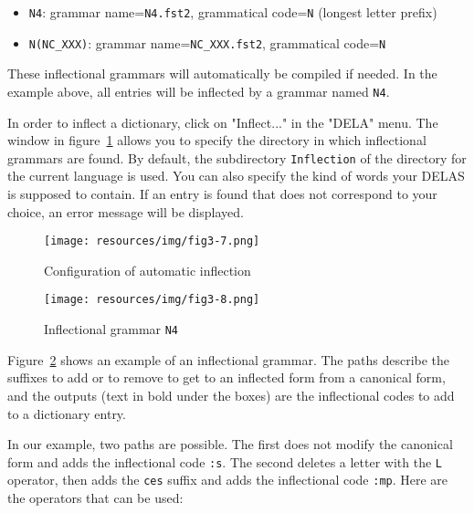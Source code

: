 \begin{itemize}
  \item \verb+N4+: grammar name=\verb+N4.fst2+, grammatical code=\verb+N+
  (longest letter prefix)
  \item \verb+N(NC_XXX)+: grammar name=\verb+NC_XXX.fst2+, grammatical code=\verb+N+
\end{itemize}

\bigskip
\noindent These inflectional grammars 
will automatically be
compiled if needed. In the example above, all entries will be inflected by a grammar named \verb+N4+.

\bigskip
\noindent In order to  inflect a dictionary, click on "Inflect..." in the "DELA" menu. The
window in figure~\ref{fig-inflection-configuration} allows you to specify the
directory in which inflectional grammars are found. By default, the subdirectory
\verb+Inflection+ of the directory for the current language is used. You can
also specify the kind of words your DELAS is supposed to contain. If an entry is
found that does not correspond to your choice, an error message will be
displayed.

\bigskip
\begin{figure}[!ht]
\begin{center}
\texttt{[image: resources/img/fig3-7.png]}
\caption{Configuration of automatic inflection\label{fig-inflection-configuration}}
\end{center}
\end{figure}

\bigskip
\begin{figure}[!ht]
\begin{center}
\texttt{[image: resources/img/fig3-8.png]}
\caption{Inflectional grammar
\texttt{N4}\label{fig-example-inflectional-grammar}}
\end{center}
\end{figure}

\bigskip
\noindent Figure~\ref{fig-example-inflectional-grammar} shows an example of an
inflectional grammar. The paths describe the suffixes to add or to remove to
get to an inflected form from a canonical form, and the outputs (text in bold under the boxes) are the
inflectional codes to add to a dictionary entry.

\bigskip
\noindent In our example, two paths are possible. The first does not modify the
canonical form and adds the inflectional code \verb+:s+. The second deletes a letter with
the \verb+L+ operator, then adds the \verb+ces+ suffix and adds the inflectional
code \verb+:mp+. Here are the operators that can be used:

